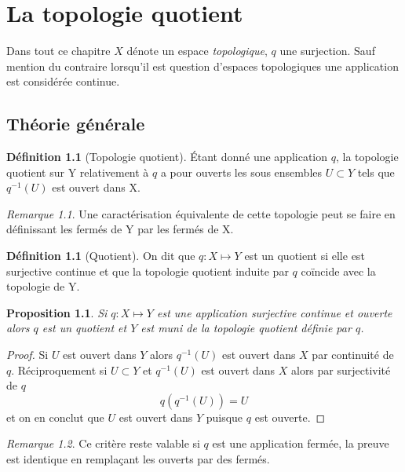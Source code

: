 \documentclass[12pt]{book}
\newtheorem{prop}[lemma]{Proposition}
\theoremstyle{definition}
\newtheorem{definition}[lemma]{Définition}
\theoremstyle{remark}
\newtheorem*{remark}{Remarque}
\begin{document}
	\chapter{La topologie quotient}
	Dans tout ce chapitre $X$ dénote un espace \emph{topologique}, $q$ une surjection. Sauf mention du contraire lorsqu'il est question d'espaces topologiques une application est considérée continue.

	\section{Théorie générale}
	\begin{definition}[Topologie quotient]
		Étant donné une application $q$, la topologie quotient sur Y relativement à $q$ a pour ouverts les sous ensembles $U \subset Y$ tels que $q^{-1}(U)$ est ouvert dans X.
	\end{definition}
	\begin{remark}
		Une caractérisation équivalente de cette topologie peut se faire en définissant les fermés de Y par les fermés de X.
	\end{remark}
	\begin{definition}[Quotient]
		On dit que $q : X \longmapsto Y$ est un quotient si elle est surjective continue et que la topologie quotient induite par $q$ coïncide avec la topologie de Y.	
	\end{definition}
	\begin{prop}
		Si $q : X \longmapsto Y$ est une application surjective continue et ouverte alors $q$ est un quotient et $Y$ est muni de la topologie quotient définie par $q$.
	\end{prop}
	\begin{proof}
		Si $U$ est ouvert dans $Y$ alors $q^{-1}(U)$ est ouvert dans $X$ par continuité de $q$. Réciproquement si  $ U \subset Y$ et $q^{-1}(U)$ est ouvert dans $X$ alors par surjectivité de $q$  \[
			q(q^{-1}(U)) = U
		\] et on en conclut que $U$ est ouvert dans $Y$ puisque $q$ est ouverte. 
	\end{proof}
	\begin{remark}
		Ce critère reste valable si $q$ est une application fermée, la preuve est identique en remplaçant les ouverts par des fermés.
	\end{remark}
\end{document}
